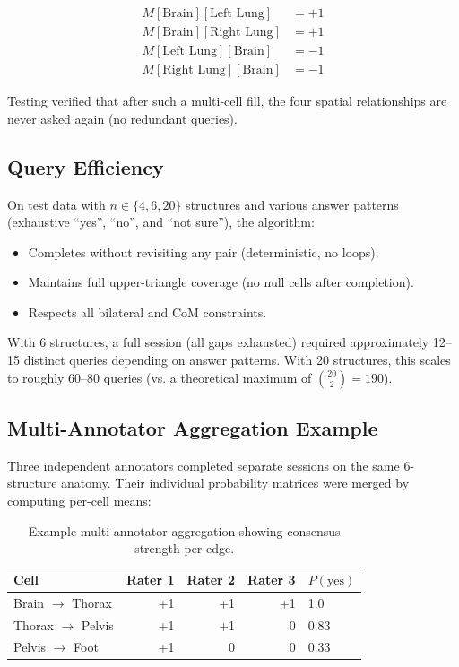 \documentclass[12pt,a4paper]{article}
\begin{document}
\begin{align}
  M[\text{Brain}][\text{Left Lung}] &= +1 \\
  M[\text{Brain}][\text{Right Lung}] &= +1 \\
  M[\text{Left Lung}][\text{Brain}] &= -1 \\
  M[\text{Right Lung}][\text{Brain}] &= -1
\end{align}

Testing verified that after such a multi-cell fill, the four spatial relationships are never asked again (no redundant queries).

\subsection{Query Efficiency}

On test data with $n \in \{4, 6, 20\}$ structures and various answer patterns (exhaustive ``yes'', ``no'', and ``not sure''), the algorithm:

\begin{itemize}
  \item Completes without revisiting any pair (deterministic, no loops).
  \item Maintains full upper-triangle coverage (no null cells after completion).
  \item Respects all bilateral and CoM constraints.
\end{itemize}

With 6 structures, a full session (all gaps exhausted) required approximately 12–15 distinct queries depending on answer patterns. With 20 structures, this scales to roughly 60–80 queries (vs. a theoretical maximum of $\binom{20}{2} = 190$).

\subsection{Multi-Annotator Aggregation Example}

Three independent annotators completed separate sessions on the same 6-structure anatomy. Their individual probability matrices were merged by computing per-cell means:

\begin{table}[H]
  \centering
  \begin{tabular}{lrrr}
    \toprule
    \textbf{Cell} & \textbf{Rater 1} & \textbf{Rater 2} & \textbf{Rater 3} & \textbf{$P(\text{yes})$} \\
    \midrule
    Brain $\to$ Thorax & +1 & +1 & +1 & 1.0 \\
    Thorax $\to$ Pelvis & +1 & +1 & 0 & 0.83 \\
    Pelvis $\to$ Foot & +1 & 0 & 0 & 0.33 \\
    \bottomrule
  \end{tabular}
  \caption{Example multi-annotator aggregation showing consensus strength per edge.}
\end{table}
\end{document}
